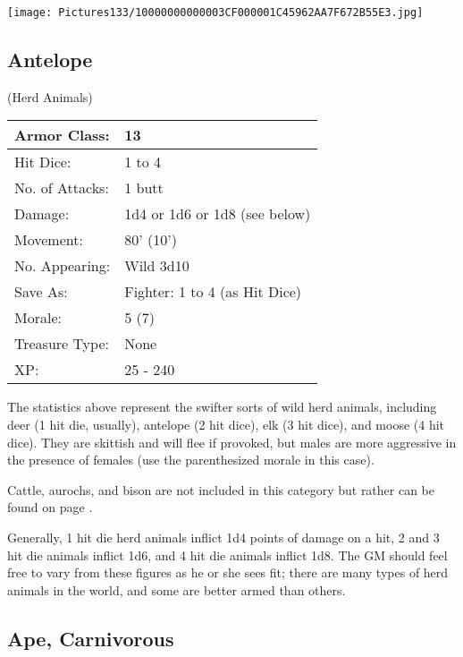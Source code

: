 \documentclass[a4paper,twoside,openany,10pt]{book}
\begin{document}
\begin{multicols}{2}
\vfill

\begin{center}
	\texttt{[image: Pictures133/10000000000003CF000001C45962AA7F672B55E3.jpg]}
\end{center}

\columnbreak

\subsection*{Antelope}(Herd Animals)\label{antelope}

\begin{tabularx}{0.48\textwidth}{ll}
Armor Class: & 13 \\\hline
Hit Dice: & 1 to 4 \\\hline
No. of Attacks: & 1 butt \\\hline
Damage: & 1d4 or 1d6 or 1d8 (see below) \\\hline
Movement: & 80' (10') \\\hline
No. Appearing: & Wild 3d10 \\\hline
Save As: & Fighter: 1 to 4 (as Hit Dice) \\\hline
Morale: & 5 (7) \\\hline
Treasure Type: & None \\\hline
XP: & 25 - 240 \\\hline
\end{tabularx}\medskip

The statistics above represent the swifter sorts of wild herd animals, including deer (1 hit die, usually), antelope (2 hit dice), elk (3 hit dice), and moose (4 hit dice). They are skittish and will flee if provoked, but males are more aggressive in the presence of females (use the parenthesized morale in this case).

Cattle, aurochs, and bison are not included in this category but rather can be found on page \hyperlink{cattle-including-aurochs-and-bison}{\pageref{cattle-including-aurochs-and-bison}}. 

Generally, 1 hit die herd animals inflict 1d4 points of damage on a hit, 2 and 3 hit die animals inflict 1d6, and 4 hit die animals inflict 1d8. The GM should feel free to vary from these figures as he or she sees fit; there are many types of herd animals in the world, and some are better armed than others.

\subsection*{Ape, Carnivorous}\label{ape-carnivorous}


\end{multicols}
\end{document}
